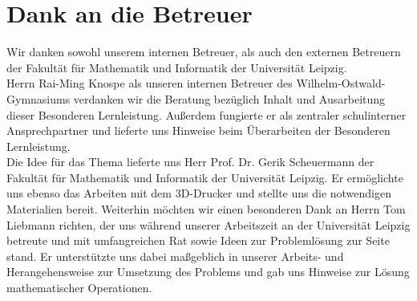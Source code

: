 \chapter*{Dank an die Betreuer}
Wir danken sowohl unserem internen Betreuer, als auch den externen Betreuern der Fakultät für Mathematik und Informatik der Universität Leipzig. \\
Herrn Rai-Ming Knospe als unseren internen Betreuer des Wilhelm-Ostwald-Gymnasiums verdanken wir die Beratung bezüglich Inhalt und Ausarbeitung dieser Besonderen Lernleistung.
Außerdem fungierte er als zentraler schulinterner Ansprechpartner und lieferte uns Hinweise beim Überarbeiten der Besonderen Lernleistung. \\
Die Idee für das Thema lieferte uns Herr Prof. Dr. Gerik Scheuermann der Fakultät für Mathematik und Informatik der Universität Leipzig.
Er ermöglichte uns ebenso das Arbeiten mit dem 3D-Drucker und stellte uns die notwendigen Materialien bereit.
Weiterhin möchten wir einen besonderen Dank an Herrn Tom Liebmann richten, der uns während unserer Arbeitszeit an der Universität Leipzig betreute und mit umfangreichen Rat sowie Ideen zur Problemlösung zur Seite stand.
Er unterstützte uns dabei maßgeblich in unserer Arbeits- und Herangehensweise zur Umsetzung des Problems und gab uns Hinweise zur Lösung mathematischer Operationen.
